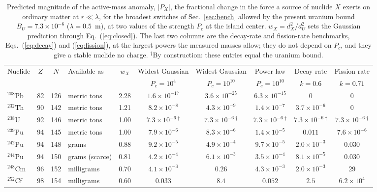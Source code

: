 \begin{table}[!htbp]
\caption{\label{tab:pred}Predicted magnitude of the active-mass anomaly, $|P_X|$, the fractional change in the force
a source of nuclide $X$ exerts on ordinary matter at $r\ll\lambda$, for the broadest switches of
Sec.~\ref{sec:bench} allowed by the present uranium bound $B_U=7.3\times10^{-6}$ ($\lambda=0.5$~m), at two values of the
strength $P_c$ at the island center. $w_X=d_X^2/d_U^2$ sets the Gaussian prediction through Eq.~(\ref{eq:closed}).
The last two columns are the decay-rate and fission-rate benchmarks, Eqs.~(\ref{eq:decay}) and (\ref{eq:fission}),
at the largest powers the measured masses allow; they do not depend on $P_c$, and they give a stable nuclide no
charge. $^\dagger$By construction: these entries equal the uranium bound.}
\begin{ruledtabular}
\begin{tabular}{lcclcccccc}
Nuclide & $Z$ & $N$ & Available as & $w_X$ & Widest Gaussian & Widest Gaussian & Power law & Decay rate & Fission rate\\
 & & & & & $P_c=10^{4}$ & $P_c=10^{10}$ & $P_c=10^{10}$ & $k=0.6$ & $k=0.71$\\
\hline
$^{208}$Pb & 82 & 126 & metric tons & 2.28 & $1.6\times10^{-17}$ & $3.6\times10^{-25}$ & $6.3\times10^{-15}$ & $0$ & $0$ \\
$^{232}$Th & 90 & 142 & metric tons & 1.21 & $8.2\times10^{-8}$ & $4.3\times10^{-9}$ & $1.4\times10^{-7}$ & $3.7\times10^{-6}$ & $0$ \\
$^{238}$U & 92 & 146 & metric tons & 1.00 & $7.3\times10^{-6}$\,$^\dagger$ & $7.3\times10^{-6}$\,$^\dagger$ & $7.3\times10^{-6}$\,$^\dagger$ & $7.3\times10^{-6}$\,$^\dagger$ & $7.3\times10^{-6}$\,$^\dagger$ \\
$^{239}$Pu & 94 & 145 & metric tons & 1.00 & $7.9\times10^{-6}$ & $8.3\times10^{-6}$ & $1.4\times10^{-5}$ & $0.011$ & $7.6\times10^{-6}$ \\
$^{242}$Pu & 94 & 148 & grams & 0.88 & $9.2\times10^{-5}$ & $4.9\times10^{-4}$ & $9.7\times10^{-5}$ & $2.0\times10^{-3}$ & $0.030$ \\
$^{244}$Pu & 94 & 150 & grams (scarce) & 0.81 & $4.2\times10^{-4}$ & $6.1\times10^{-3}$ & $3.5\times10^{-4}$ & $8.1\times10^{-5}$ & $0.030$ \\
$^{248}$Cm & 96 & 152 & milligrams & 0.70 & $4.1\times10^{-3}$ & $0.26$ & $4.3\times10^{-3}$ & $2.0\times10^{-3}$ & $29$ \\
$^{252}$Cf & 98 & 154 & milligrams & 0.60 & $0.033$ & $8.4$ & $0.052$ & $2.5$ & $6.2\times10^{4}$ \\
\end{tabular}
\end{ruledtabular}
\end{table}
